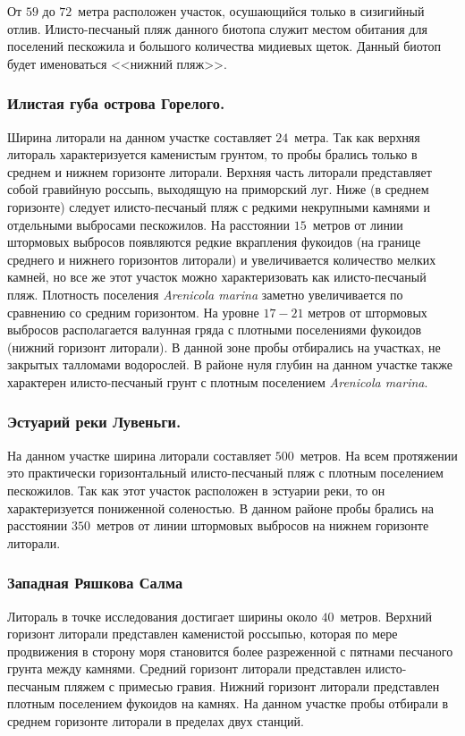 От $59$ до $72$~метра расположен участок, осушающийся только в сизигийный отлив. 
Илисто-песчаный пляж данного биотопа служит местом обитания для поселений пескожила и большого количества мидиевых щеток. 
Данный биотоп будет именоваться <<нижний пляж>>. 


\subsubsection{Илистая губа острова Горелого.}
Ширина литорали на данном участке составляет $24$~метра. 
Так как верхняя литораль характеризуется каменистым грунтом, то пробы брались только в среднем и нижнем горизонте литорали.
Верхняя часть литорали представляет собой гравийную россыпь, выходящую на приморский луг. 
Ниже (в среднем горизонте) следует илисто-песчаный пляж с редкими некрупными камнями и отдельными выбросами пескожилов.  
На расстоянии $15$~метров от линии штормовых выбросов появляются редкие вкрапления фукоидов (на границе среднего и нижнего горизонтов литорали) и увеличивается количество мелких камней, но  все же этот участок можно характеризовать как илисто-песчаный пляж. 
Плотность поселения {\it Arenicola marina} заметно увеличивается по сравнению со средним горизонтом.
На уровне $17-21$ метров от штормовых выбросов располагается валунная гряда с плотными поселениями фукоидов (нижний горизонт литорали). 
В данной зоне пробы отбирались на участках, не закрытых талломами водорослей. 
В районе нуля глубин на данном участке также характерен илисто-песчаный грунт с плотным поселением {\it Arenicola marina}.


\subsubsection{Эстуарий реки Лувеньги.}
На данном участке ширина литорали составляет $500$~метров. 
На всем протяжении это практически горизонтальный илисто-песчаный пляж с плотным поселением пескожилов. 
Так как этот участок расположен в эстуарии реки, то он характеризуется пониженной соленостью. 
В данном районе пробы брались на расстоянии $350$~метров от линии штормовых выбросов на нижнем горизонте литорали.

\subsubsection{Западная Ряшкова Салма}
Литораль в точке исследования достигает ширины около $40$~метров.
Верхний горизонт литорали представлен каменистой россыпью, которая по мере продвижения в сторону моря становится более разреженной с пятнами песчаного грунта между камнями.
Средний горизонт литорали представлен илисто-песчаным пляжем с примесью гравия.
Нижний горизонт литорали представлен плотным поселением фукоидов на камнях.
На данном участке пробы отбирали в среднем горизонте литорали в пределах двух станций.



